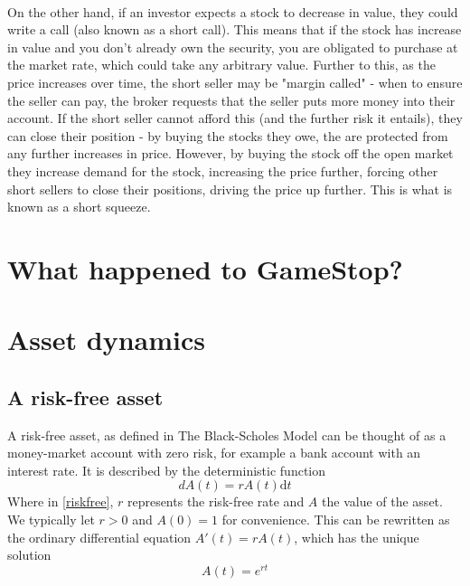 \documentclass[11pt]{article} %
\begin{document}
\paragraph{}
On the other hand, if an investor expects a stock to decrease 
in value, they could write a call (also known as a short call). This 
means that if the stock has increase in value and you don't already own 
the security, you are obligated to purchase at the market rate, which 
could take any arbitrary value. Further to this, as the price increases 
over time, the short seller may be "margin called" - when to ensure the 
seller can pay, the broker requests that the seller puts more money into 
their account. If the short seller cannot afford this (and the further 
risk it entails), they can close their position - by buying the stocks 
they owe, the are protected from any further increases in price. However, 
by buying the stock off the open market they increase demand for the 
stock, increasing the price further, forcing other short sellers to 
close their positions, driving the price up further. This is what is 
known as a short squeeze.

\section{What happened to GameStop?}

\section{Asset dynamics}

\subsection{A risk-free asset}
A risk-free asset, as defined in The Black-Scholes Model \cite{blackscholes} can be thought
of as a money-market account with zero risk, for example a bank account with an interest 
rate. It is described by the deterministic function 
\begin{equation} \label{riskfree}
    dA(t) = rA(t)\mathrm{d}t 
\end{equation}
Where in \ref{riskfree}, $r$ represents the risk-free rate and $A$ the value of the 
asset. We typically let $r>0$ and $A(0) = 1$ for convenience. This can be rewritten as 
the ordinary differential equation $A'(t) = rA(t)$, which has the unique solution 
\begin{equation} \label{riskfree solution}
    A(t) =e^{rt}
\end{equation}
\end{document}
